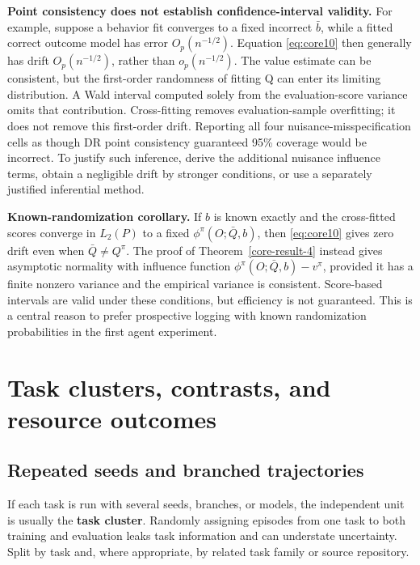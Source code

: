 \textbf{Point consistency does not establish confidence-interval validity.} For example, suppose a behavior fit converges to a fixed incorrect \(\bar b\), while a fitted correct outcome model has error \(O_p(n^{-1/2})\). Equation \eqref{eq:core10} then generally has drift \(O_p(n^{-1/2})\), rather than \(o_p(n^{-1/2})\). The value estimate can be consistent, but the first-order randomness of fitting Q can enter its limiting distribution. A Wald interval computed solely from the evaluation-score variance omits that contribution. Cross-fitting removes evaluation-sample overfitting; it does not remove this first-order drift. Reporting all four nuisance-misspecification cells as though DR point consistency guaranteed 95\% coverage would be incorrect. To justify such inference, derive the additional nuisance influence terms, obtain a negligible drift by stronger conditions, or use a separately justified inferential method.

\textbf{Known-randomization corollary.} If \(b\) is known exactly and the cross-fitted scores converge in \(L_2(P)\) to a fixed \(\phi^{\pi}(O;\bar Q,b)\), then \eqref{eq:core10} gives zero drift even when \(\bar Q\ne Q^{\pi}\). The proof of Theorem~\ref{core-result-4} instead gives asymptotic normality with influence function \(\phi^{\pi}(O;\bar Q,b)-v^{\pi}\), provided it has a finite nonzero variance and the empirical variance is consistent. Score-based intervals are valid under these conditions, but efficiency is not guaranteed. This is a central reason to prefer prospective logging with known randomization probabilities in the first agent experiment.

\section{Task clusters, contrasts, and resource outcomes}\label{task-clusters-contrasts-and-resource-outcomes}

\subsection{Repeated seeds and branched trajectories}\label{repeated-seeds-and-branched-trajectories}

If each task is run with several seeds, branches, or models, the independent unit is usually the \textbf{task cluster}. Randomly assigning episodes from one task to both training and evaluation leaks task information and can understate uncertainty. Split by task and, where appropriate, by related task family or source repository.

